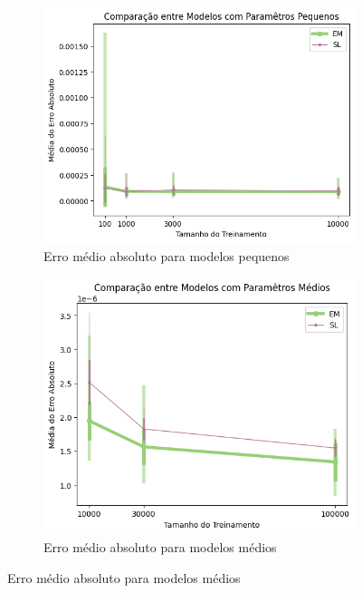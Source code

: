\documentclass{subfiles}
\begin{document}
\begin{figure}
    \centering
    \begin{subfigure}[b]{0.3\linewidth}
        \centering
        \includegraphics[width=\linewidth]{Figures/resultados/small_abs_prob_error}
        \caption{Erro médio absoluto para modelos pequenos}
    \end{subfigure}
    \hfill
    \begin{subfigure}[b]{0.3\linewidth}
        \centering
        \includegraphics[width=\linewidth]{Figures/resultados/medium_abs_prob_error}
        \caption{Erro médio absoluto para modelos médios}
    \end{subfigure}

\end{figure}
\end{document}
